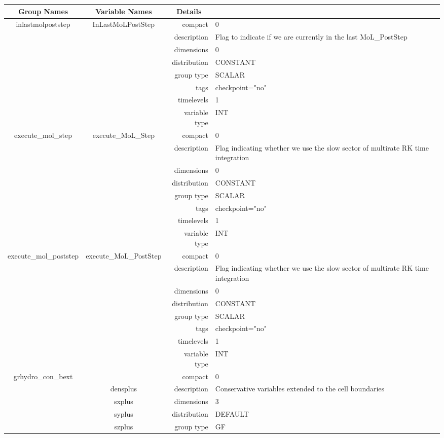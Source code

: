 \begin{tabular*}{150mm}{|c|c@{\extracolsep{\fill}}|rl|} \hline 
~ {\bf Group Names} ~ & ~ {\bf Variable Names} ~  &{\bf Details} ~ & ~\\ 
\hline 
inlastmolpoststep & InLastMoLPostStep & compact & 0 \\ 
 &  & description & Flag to indicate if we are currently in the last MoL\_PostStep \\ 
 &  & dimensions & 0 \\ 
 &  & distribution & CONSTANT \\ 
 &  & group type & SCALAR \\ 
 &  & tags & checkpoint="no" \\ 
 &  & timelevels & 1 \\ 
 &  & variable type & INT \\ 
\hline 
execute\_mol\_step & execute\_MoL\_Step & compact & 0 \\ 
 &  & description & Flag indicating whether we use the slow sector of multirate RK time integration \\ 
 &  & dimensions & 0 \\ 
 &  & distribution & CONSTANT \\ 
 &  & group type & SCALAR \\ 
 &  & tags & checkpoint="no" \\ 
 &  & timelevels & 1 \\ 
 &  & variable type & INT \\ 
\hline 
execute\_mol\_poststep & execute\_MoL\_PostStep & compact & 0 \\ 
 &  & description & Flag indicating whether we use the slow sector of multirate RK time integration \\ 
 &  & dimensions & 0 \\ 
 &  & distribution & CONSTANT \\ 
 &  & group type & SCALAR \\ 
 &  & tags & checkpoint="no" \\ 
 &  & timelevels & 1 \\ 
 &  & variable type & INT \\ 
\hline 
grhydro\_con\_bext &  & compact & 0 \\ 
 & densplus & description & Conservative variables extended to the cell boundaries \\ 
 & sxplus & dimensions & 3 \\ 
 & syplus & distribution & DEFAULT \\ 
 & szplus & group type & GF \\ 

\end{tabular*}
